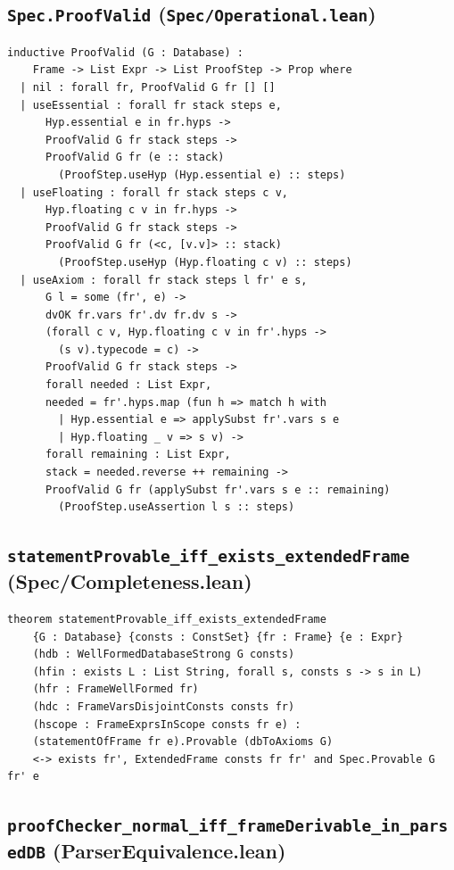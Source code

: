 \documentclass[11pt]{article}
\newcommand{\file}[1]{\texttt{#1}}
\begin{document}
\subsection{\texttt{Spec.ProofValid} (\file{Spec/Operational.lean})}

\begin{lstlisting}[label=lst:proofvalid]
inductive ProofValid (G : Database) :
    Frame -> List Expr -> List ProofStep -> Prop where
  | nil : forall fr, ProofValid G fr [] []
  | useEssential : forall fr stack steps e,
      Hyp.essential e in fr.hyps ->
      ProofValid G fr stack steps ->
      ProofValid G fr (e :: stack)
        (ProofStep.useHyp (Hyp.essential e) :: steps)
  | useFloating : forall fr stack steps c v,
      Hyp.floating c v in fr.hyps ->
      ProofValid G fr stack steps ->
      ProofValid G fr (<c, [v.v]> :: stack)
        (ProofStep.useHyp (Hyp.floating c v) :: steps)
  | useAxiom : forall fr stack steps l fr' e s,
      G l = some (fr', e) ->
      dvOK fr.vars fr'.dv fr.dv s ->
      (forall c v, Hyp.floating c v in fr'.hyps ->
        (s v).typecode = c) ->
      ProofValid G fr stack steps ->
      forall needed : List Expr,
      needed = fr'.hyps.map (fun h => match h with
        | Hyp.essential e => applySubst fr'.vars s e
        | Hyp.floating _ v => s v) ->
      forall remaining : List Expr,
      stack = needed.reverse ++ remaining ->
      ProofValid G fr (applySubst fr'.vars s e :: remaining)
        (ProofStep.useAssertion l s :: steps)
\end{lstlisting}

\subsection{\texttt{statementProvable\_iff\_exists\_extendedFrame} (Spec/Completeness.lean)}

\begin{lstlisting}[label=lst:equiv-full]
theorem statementProvable_iff_exists_extendedFrame
    {G : Database} {consts : ConstSet} {fr : Frame} {e : Expr}
    (hdb : WellFormedDatabaseStrong G consts)
    (hfin : exists L : List String, forall s, consts s -> s in L)
    (hfr : FrameWellFormed fr)
    (hdc : FrameVarsDisjointConsts consts fr)
    (hscope : FrameExprsInScope consts fr e) :
    (statementOfFrame fr e).Provable (dbToAxioms G)
    <-> exists fr', ExtendedFrame consts fr fr' and Spec.Provable G fr' e
\end{lstlisting}

\subsection{\texttt{proofChecker\_normal\_iff\_frameDerivable\_in\_parsedDB}
(ParserEquivalence.lean)}
\end{document}
